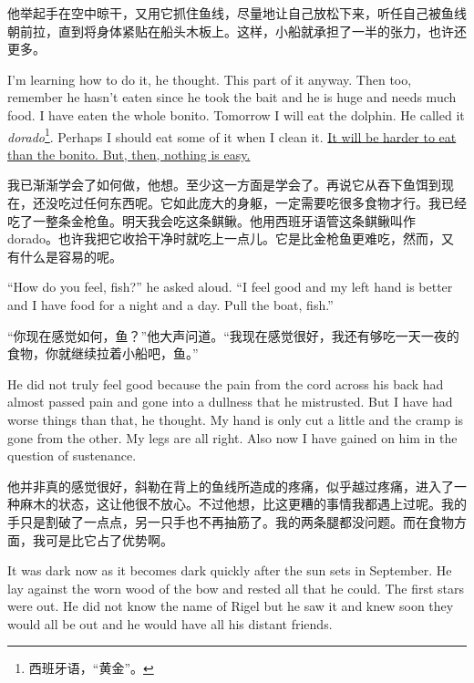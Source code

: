 \begin{paracol}{2}
\switchcolumn

他举起手在空中晾干，又用它抓住鱼线，尽量地让自己放松下来，听任自己被鱼线朝前拉，直到将身体紧贴在船头木板上。这样，小船就承担了一半的张力，也许还更多。

\switchcolumn*

I'm learning how to do it, he thought. This part of it anyway. Then too,
remember he hasn't eaten since he took the bait and he is huge and needs
much food. I have eaten the whole bonito. Tomorrow I will eat the dolphin.
He called it \emph{dorado}\footnote{西班牙语，“黄金”。}. Perhaps I should
eat some of it when I clean it. \uline{It will be harder to eat than the
  bonito. But, then, nothing is easy.}

\switchcolumn

我已渐渐学会了如何做，他想。至少这一方面是学会了。再说它从吞下鱼饵到现在，还没吃过任何东西呢。它如此庞大的身躯，一定需要吃很多食物才行。我已经吃了一整条金枪鱼。明天我会吃这条鲯鳅。他用西班牙语管这条鲯鳅叫作dorado。也许我把它收拾干净时就吃上一点儿。它是比金枪鱼更难吃，然而，又有什么是容易的呢。

\switchcolumn*

``How do you feel, fish?'' he asked aloud. ``I feel good and my left hand is
better and I have food for a night and a day. Pull the boat, fish.''

\switchcolumn

“你现在感觉如何，鱼？”他大声问道。“我现在感觉很好，我还有够吃一天一夜的食物，你就继续拉着小船吧，鱼。”

\switchcolumn*

He did not truly feel good because the pain from the cord across his back
had almost passed pain and gone into a \gls{dullness} that he
\gls{mistrusted}. But I have had worse things than that, he thought. My hand
is only cut a little and the cramp is gone from the other. My legs are all
right. Also now I have gained on him in the question of \gls{sustenance}.

\switchcolumn

他并非真的感觉很好，斜勒在背上的鱼线所造成的疼痛，似乎越过疼痛，进入了一种麻木的状态，这让他很不放心。不过他想，比这更糟的事情我都遇上过呢。我的手只是割破了一点点，另一只手也不再抽筋了。我的两条腿都没问题。而在食物方面，我可是比它占了优势啊。

\switchcolumn*

It was dark now as it becomes dark quickly after the sun sets in September.
He lay against the \gls{worn} wood of the bow and rested all that he could. The
first stars were out. He did not know the name of \gls{Rigel} but he saw it and
knew soon they would all be out and he would have all his \gls{distant} friends.


\end{paracol}
